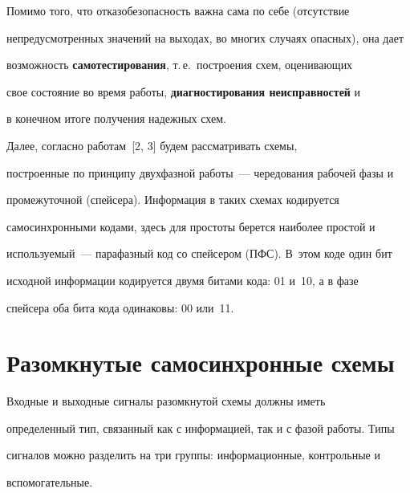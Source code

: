       


      Помимо того, что отказобезопасность важна сама по себе (отсутствие 


непредусмотренных значений на выходах, во многих случаях опасных), она дает 


возможность \textbf{самотестирования}, т.\,е.\ построения схем, оценивающих 


свое состояние во время работы, \textbf{диагностирования неисправностей} и 


в конечном итоге получения надежных схем.


      


      Далее, согласно работам~[2, 3] будем рассматривать схемы, 


построенные по принципу двухфазной работы~--- чередования рабочей фазы и 


промежуточной (спейсера). Информация в таких схемах кодируется 


самосинхронными кодами, здесь для простоты берется наиболее простой и 


используемый~--- парафазный код со спейсером (ПФС). В~этом коде один бит 


исходной информации кодируется двумя битами кода: 01 и~10, а в фазе 


спейсера оба бита кода одинаковы: 00 или~11.







      


      \section{Разомкнутые самосинхронные схемы}


      




      


      Входные и выходные сигналы разомкнутой схемы должны иметь 


определенный тип, связанный как с информацией, так и с фазой работы. Типы 


сигналов можно разделить на три группы: информационные, контрольные и 


вспомогательные.


